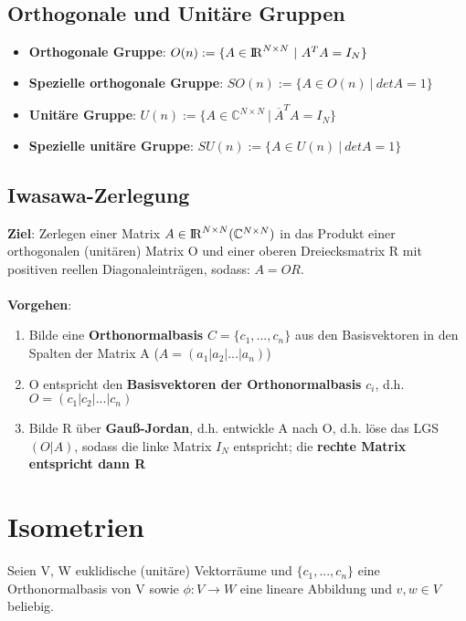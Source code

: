 \documentclass[10pt,a4paper]{article}
\def\realnumbers{{\rm I\!R}}
\def\complexnumbers{{\mathbb{C}}}
\begin{document}
	\subsection{Orthogonale und Unitäre Gruppen}
	\label{os:sub:orthogonale_und_unitaere_gruppen}
	
	\begin{itemize}
		\item \textbf{Orthogonale Gruppe}: $O(n) := \{A \in \realnumbers^{N\times N}\ |\ A^TA = I_N\}$
		\item \textbf{Spezielle orthogonale Gruppe}: $SO(n) := \{A \in O(n)\ |\ det A = 1\}$
		\item \textbf{Unitäre Gruppe}: $U(n) := \{A \in \complexnumbers^{N\times N}\ |\ \overline{A}^TA = I_N\}$
		\item \textbf{Spezielle unitäre Gruppe}: $SU(n) := \{A \in U(n)\ |\ det A = 1\}$
	\end{itemize}

	\subsection{Iwasawa-Zerlegung}
	\label{os:sub:iwasawa_zerlegung}
	
	\textbf{Ziel}: Zerlegen einer Matrix $A \in \realnumbers^{N\times N} (\complexnumbers^{N\times N})$ in das Produkt einer orthogonalen (unitären) Matrix O und einer oberen Dreiecksmatrix R mit positiven reellen Diagonaleinträgen, sodass: $A = OR$.\\\\
	\textbf{Vorgehen}:
	\begin{enumerate}
		\item Bilde eine \textbf{Orthonormalbasis} $C = \{c_1, ..., c_n\}$ aus den Basisvektoren in den Spalten der Matrix A ($A = (a_1 | a_2 | ... | a_n)$)
		\item O entspricht den \textbf{Basisvektoren der Orthonormalbasis} $c_i$, d.h. $O = (c_1 | c_2 | ... | c_n)$
		\item Bilde R über \textbf{Gauß-Jordan}, d.h. entwickle A nach O, d.h. löse das LGS $(O | A)$, sodass die linke Matrix $I_N$ entspricht; die \textbf{rechte Matrix entspricht dann R}
	\end{enumerate}
	
	\newpage
	\section{Isometrien}
	Seien V, W euklidische (unitäre) Vektorräume und $\{c_1, ..., c_n\}$ eine Orthonormalbasis von V sowie $\phi: V \rightarrow W$ eine lineare Abbildung und $v, w \in V$ beliebig.
	
\end{document}
